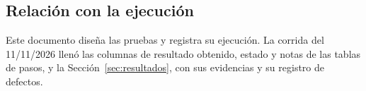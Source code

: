 \subsection{Relación con la ejecución}

Este documento diseña las pruebas y registra su ejecución. La corrida del 11/11/2026 llenó las columnas de resultado obtenido, estado y notas de las tablas de pasos, y la Sección~\ref{sec:resultados}, con sus evidencias y su registro de defectos.
